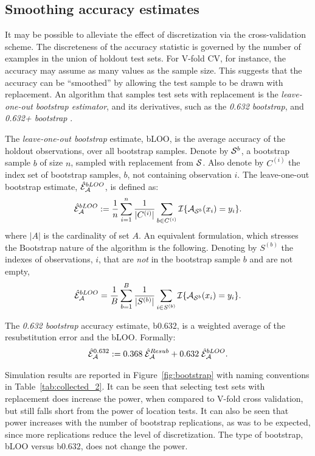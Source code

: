 \documentclass[12pt,a4paper]{article}
\begin{document}
\subsection{Smoothing accuracy estimates}
\label{sec:bootstrap}
It may be possible to alleviate the effect of discretization via the cross-validation scheme.
The discreteness of the accuracy statistic is governed by the number of examples in the union of holdout test sets.
For V-fold CV, for instance, the accuracy may assume as many values as the sample size. 
This suggests that the accuracy can be ``smoothed'' by allowing the test sample to be drawn with replacement. 
An algorithm that samples test sets with replacement is the \emph{leave-one-out bootstrap estimator},  and its derivatives, such as the \emph{0.632 bootstrap}, and \emph{0.632+ bootstrap} \citep[Sec 7.11]{hastie_elements_2003}.
\begin{definition}[bLOO]
	\label{def:bloo}
	The \emph{leave-one-out bootstrap} estimate, bLOO, is the average accuracy of the holdout observations, over all bootstrap samples. 
	Denote by $\mathcal{S}^b$, a bootstrap sample $b$ of size $n$, sampled with replacement from $\mathcal{S}$. 
	Also denote by $C^{(i)}$ the index set of bootstrap samples, $b$, not containing observation $i$.
	The leave-one-out bootstrap estimate, $\hat{\mathcal{E}}_{\mathcal{A}}^{bLOO}$,  is defined as:
	\begin{align}
	\hat{\mathcal{E}}_{\mathcal{A}}^{bLOO}:= \frac 1n \sum_{i=1}^{n} \frac{1}{|C^{(i)}|} \sum_{b \in C^{(i)}} \mathcal{I}{\{ \mathcal{A}_{\mathcal{S}^b}(x_i)=y_i \}}.
	\end{align}
	where $|A|$ is the cardinality of set $A$.
	An equivalent formulation, which stresses the Bootstrap nature of the algorithm is the following. 
	Denoting by $S^{(b)}$ the indexes of observations, $i$, that are \emph{not} in the bootstrap sample $b$ and are not empty, 
	\begin{align}
	\hat{\mathcal{E}}_{\mathcal{A}}^{bLOO} = \frac 1B \sum_{b=1}^{B} \frac{1}{|S^{(b)}|} \sum_{i \in S^{(b)}} \mathcal{I}{\{ \mathcal{A}_{\mathcal{S}^b}(x_i)=y_i \}}.
	\end{align}
\end{definition}

\begin{definition}[b$0.632$]
	\label{def:b0632}
	The \emph{0.632 bootstrap} accuracy estimate, b$0.632$, is a weighted average of the resubstitution error and the bLOO.
	Formally:
	\begin{align}
	\hat{\mathcal{E}}_{\mathcal{A}}^{0.632} := 0.368 \; \hat{\mathcal{E}}_{\mathcal{A}}^{Resub}  + 0.632 \; \hat{\mathcal{E}}_{\mathcal{A}}^{bLOO}.
	\end{align}
\end{definition}
Simulation results are reported in Figure~\ref{fig:bootstrap} with naming conventions in Table~\ref{tab:collected_2}.
It can be seen that selecting test sets with replacement does increase the power, when compared to V-fold cross validation, but still falls short from the power of location tests. 
It can also be seen that power increases with the number of bootstrap replications, as was to be expected, since more replications reduce the level of discretization.
The type of bootstrap, bLOO versus b$0.632$, does not change the power. 
\end{document}
